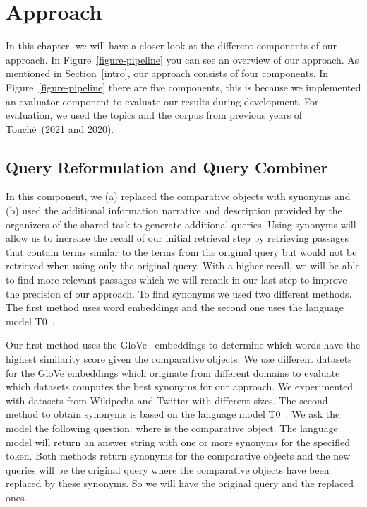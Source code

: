 \section{Approach}\label{approach}



In this chapter, we will have a closer look at the different components of our approach.
In Figure~\ref{figure-pipeline} you can see an overview of our approach.
As mentioned in Section~\ref{intro}, our approach consists of four components.
In Figure~\ref{figure-pipeline} there are five components, this is because we implemented an evaluator component to evaluate our results during development.
For evaluation, we used the topics and the corpus from previous years of Touché~(2021 and 2020).

\subsection{Query Reformulation and Query Combiner}\label{reformulation}

In this component, we (a) replaced the comparative objects with synonyms and (b) used the additional information narrative and description provided by the organizers of the shared task to generate additional queries.
Using synonyms will allow us to increase the recall of our initial retrieval step by retrieving passages that contain terms similar to the terms from the original query but would not be retrieved when using only the original query.
With a higher recall, we will be able to find more relevant passages which we will rerank in our last step to improve the precision of our approach.
To find synonyms we used two different methods.
The first method uses word embeddings and the second one uses the language model T0~\cite{SanhWRBSACSLRDBXTSSKCNDCJWMSYPBWNRSSFFTBGBWR2021}.

Our first method uses the GloVe~\cite{PenningtonSM2014} embeddings to determine which words have the highest similarity score given the comparative objects.
We use different datasets for the GloVe embeddings which originate from different domains to evaluate which datasets computes the best synonyms for our approach.
We experimented with datasets from Wikipedia and Twitter with different sizes.
The second method to obtain synonyms is based on the language model T0~\cite{SanhWRBSACSLRDBXTSSKCNDCJWMSYPBWNRSSFFTBGBWR2021}.
We ask the model the following question:  where  is the comparative object.
The language model will return an answer string with one or more synonyms for the specified token.
Both methods return synonyms for the comparative objects and the new queries will be the original query where the comparative objects have been replaced by these synonyms.
So we will have the original query and the replaced ones.

